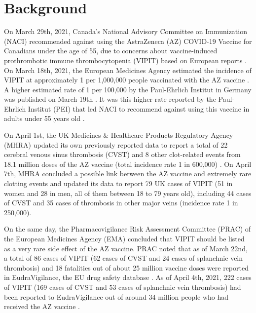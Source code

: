 \documentclass[]{interact}
\theoremstyle{plain}%
\theoremstyle{definition}
\theoremstyle{remark}
\begin{document}
\hypertarget{background}{%
\section{Background}\label{background}}

On March 29th, 2021, Canada's National Advisory Committee on
Immunization (NACI) recommended against using the AstraZeneca (AZ)
COVID-19 Vaccine for Canadians under the age of 55, due to concerns
about vaccine-induced prothrombotic immune thrombocytopenia (VIPIT)
based on European reports
\citep{naci_naci_2021, greinacher_thrombotic_2021, schultz_thrombosis_2021}.
On March 18th, 2021, the European Medicines Agency estimated the
incidence of VIPIT at approximately 1 per 1,000,000 people vaccinated
with the AZ vaccine \citep{ema_covid-19_2021}. A higher estimated rate
of 1 per 100,000 by the Paul-Ehrlich Institut in Germany was published
on March 19th \citep{pei_covid-19_2021}. It was this higher rate
reported by the Paul-Ehrlich Institut (PEI) that led NACI to recommend
against using this vaccine in adults under 55 years old
\citep{naci_naci_2021}.

On April 1st, the UK Medicines \& Healthcare Products Regulatory Agency
(MHRA) updated its own previously reported data to report a total of 22
cerebral venous sinus thrombosis (CVST) and 8 other clot-related events
from 18.1 million doses of the AZ vaccine (total incidence rate 1 in
600,000) \citep{mhra_coronavirus_2021}. On April 7th, MHRA concluded a
possible link between the AZ vaccine and extremely rare clotting events
and updated its data to report 79 UK cases of VIPIT (51 in women and 28
in men, all of them between 18 to 79 years old), including 44 cases of
CVST and 35 cases of thrombosis in other major veins (incidence rate 1
in 250,000)\citep{mhra_mhra_2021}.

On the same day, the Pharmacovigilance Risk Assessment Committee (PRAC)
of the European Medicines Agency (EMA) concluded that VIPIT should be
listed as a very rare side effect of the AZ vaccine. PRAC noted that as
of March 22nd, a total of 86 cases of VIPIT (62 cases of CVST and 24
cases of splanchnic vein thrombosis) and 18 fatalities out of about 25
million vaccine doses were reported in EudraVigilance, the EU drug
safety database \citep{ema_astrazenecas_2021}. As of April 4th, 2021,
222 cases of VIPIT (169 cases of CVST and 53 cases of splanchnic vein
thrombosis) had been reported to EudraVigilance out of around 34 million
people who had received the AZ vaccine \citep{ema_astrazenecas_2021}.
\end{document}
